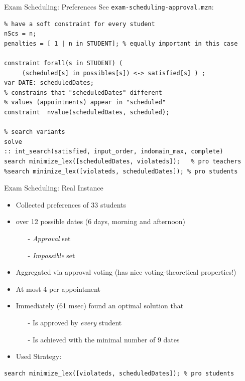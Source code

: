 \begin{frame}[fragile]{Exam Scheduling: Preferences}
See \texttt{exam-scheduling-approval.mzn}:
\begin{lstlisting}
% have a soft constraint for every student
nScs = n;
penalties = [ 1 | n in STUDENT]; % equally important in this case 

constraint forall(s in STUDENT) ( 
     (scheduled[s] in possibles[s]) <-> satisfied[s] ) ;
var DATE: scheduledDates;
% constrains that "scheduledDates" different 
% values (appointments) appear in "scheduled"
constraint  nvalue(scheduledDates, scheduled);

% search variants 
solve 
:: int_search(satisfied, input_order, indomain_max, complete)
search minimize_lex([scheduledDates, violateds]);   % pro teachers
%search minimize_lex([violateds, scheduledDates]); % pro students
\end{lstlisting}
\end{frame}


\begin{frame}[fragile]{Exam Scheduling: Real Instance}

\begin{itemize}
\item Collected preferences of 33 students
\item over 12 possible dates (6 days, morning and afternoon)
\begin{itemize}
\item[-] \emph{Approval} set 
\item[-] \emph{Impossible} set 
\end{itemize}

\vspace*{2ex}

\item Aggregated via \alert{approval voting} (has nice voting-theoretical properties!)
\item At most 4 per appointment

\item Immediately (61 msec) found an optimal solution that
\begin{itemize}
\item[-] Is approved by \emph{every} student
\item[-] Is achieved with the minimal number of 9 dates 
\end{itemize}
\item Used Strategy:
\end{itemize}
\begin{lstlisting}
search minimize_lex([violateds, scheduledDates]); % pro students
\end{lstlisting}
\end{frame}

